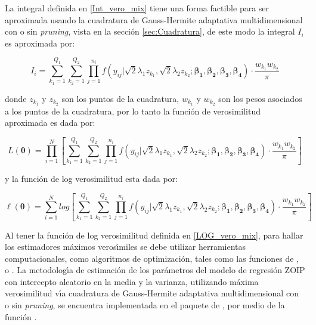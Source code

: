 La integral definida en \eqref{Int_vero_mix} tiene una forma factible para ser aproximada usando la cuadratura de Gauss-Hermite adaptativa multidimensional con o sin \textit{pruning}, vista en la secci\'{o}n \ref{sec:Cuadratura}, de este modo la integral $I_i$ es aproximada por:

\[
I_i=\sum_{k_1=1}^{Q_1}{\sum_{k_2=1}^{Q_2}{\prod_{j=1}^{n_i}f(y_{ij}|\sqrt{2}\lambda_1 z_{k_1},\sqrt{2}\lambda_2 z_{k_2};\boldsymbol{\beta_1}, \boldsymbol{\beta_2}, \boldsymbol{\beta_3}, \boldsymbol{\beta_4})\cdot \frac{w_{k_1}w_{k_2}}{\pi}}}
\]

donde $z_{k_1}$ y $z_{k_2}$ son los puntos de la cuadratura, $w_{k_1}$ y $w_{k_2}$ son los pesos asociados a los puntos de la cuadratura, por lo tanto la funci\'{o}n de verosimilitud aproximada es dada por:

\[
L(\boldsymbol{\theta})=\prod_{i=1}^{N}{\left[\sum_{k_1=1}^{Q_1}{\sum_{k_2=1}^{Q_2}{\prod_{j=1}^{n_i}f(y_{ij}|\sqrt{2}\lambda_1 z_{k_1},\sqrt{2}\lambda_2 z_{k_2};\boldsymbol{\beta_1}, \boldsymbol{\beta_2}, \boldsymbol{\beta_3}, \boldsymbol{\beta_4})\cdot \frac{w_{k_1}w_{k_2}}{\pi}}}\right]}
\]

y la funci\'{o}n de log verosimilitud esta dada por:

\begin{equation}
\ell(\boldsymbol{\theta})=\sum_{i=1}^{N}log{\left[\sum_{k_1=1}^{Q_1}{\sum_{k_2=1}^{Q_2}{\prod_{j=1}^{n_i}f(y_{ij}|\sqrt{2}\lambda_1 z_{k_1},\sqrt{2}\lambda_2 z_{k_2};\boldsymbol{\beta_1}, \boldsymbol{\beta_2}, \boldsymbol{\beta_3}, \boldsymbol{\beta_4})\cdot \frac{w_{k_1}w_{k_2}}{\pi}}}\right]}
\label{LOG_vero_mix}
\end{equation}

Al tener la funci\'{o}n de log verosimilitud definida en \eqref{LOG_vero_mix}, para hallar los estimadores m\'{a}ximos veros\'{\i}miles se debe utilizar herramientas computacionales, como algoritmos de optimizaci\'{o}n, tales como las funciones de ,  o . La metodolog\'{\i}a de estimaci\'{o}n de los pa\-r\'{a}\-me\-tros del modelo de regresi\'{o}n ZOIP con intercepto aleatorio en la media y la varianza, utilizando m\'{a}xima verosimilitud v\'{\i}a cuadratura de Gauss-Hermite adaptativa multidimensional con o sin \textit{pruning}, se encuentra implementada en el paquete  de , por medio de la funci\'{o}n .

